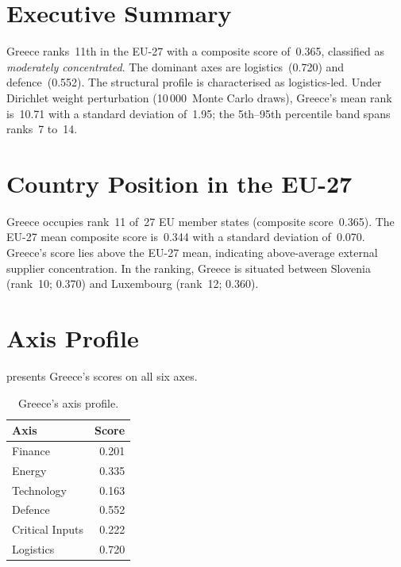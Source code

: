 \documentclass[12pt,a4paper]{article}
\begin{document}
\hypersetup{pageanchor=true}
\pagestyle{fancy}
\renewcommand{\headrulewidth}{0.4pt}


\section{Executive Summary}
\label{sec:summary}

Greece ranks~11th in the EU-27 with a composite \ISI score of~0.365, classified as \emph{moderately concentrated}.  The dominant axes are logistics~(0.720) and defence~(0.552).  The structural profile is characterised as logistics-led.  Under Dirichlet weight perturbation (10\,000~Monte Carlo draws), Greece's mean rank is~10.71 with a standard deviation of~1.95; the 5th--95th percentile band spans ranks~7 to~14.


\section{Country Position in the EU-27}
\label{sec:position}

Greece occupies rank~11 of~27 EU member states (composite score~0.365).  The EU-27 mean composite score is~0.344 with a standard deviation of~0.070.  Greece's score lies above the EU-27 mean, indicating above-average external supplier concentration.  In the ranking, Greece is situated between Slovenia (rank~10; 0.370) and Luxembourg (rank~12; 0.360).


\section{Axis Profile}
\label{sec:axis-profile}

 presents Greece's scores on all six \ISI axes.

\begin{table}[htbp]
\centering\small
\caption{Greece's \ISI axis profile.}
\label{tab:axis-profile}
\begin{tabular}{@{}lr@{}}
\toprule
\textbf{Axis} & \textbf{Score} \\
\midrule
    Finance           & 0.201 \\
    Energy            & 0.335 \\
    Technology        & 0.163 \\
    Defence           & 0.552 \\
    Critical Inputs   & 0.222 \\
    Logistics         & 0.720 \\
\bottomrule
\end{tabular}
\end{table}
\end{document}
